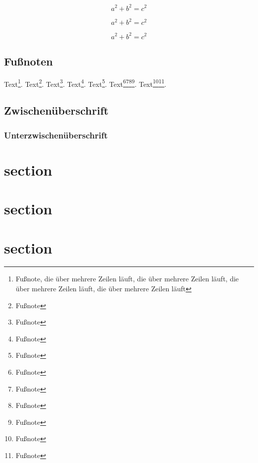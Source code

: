\documentclass[ngerman]{scrartcl}
\begin{document}
	\begin{equation}
		a^2+b^2=c^2
	\end{equation}

	\begin{equation}
		a^2+b^2=c^2
	\end{equation}

	\begin{equation}
		a^2+b^2=c^2
	\end{equation}

	\subsection{Fußnoten}

	Text\footnote{Fußnote, die über mehrere Zeilen läuft, die über mehrere Zeilen läuft, die über mehrere Zeilen läuft, die über mehrere Zeilen läuft}.
	Text\footnote{Fußnote}.
	Text\footnote{Fußnote}.
	Text\footnote{Fußnote}.
	Text\footnote{Fußnote}.
	Text\footnote{Fußnote}\multiplefootnoteseparator\footnote{Fußnote}\footnote{Fußnote}\footnote{Fußnote}.
	Text\footnote{Fußnote}\footnote{Fußnote}.

	\lipsum[1-1]




	\lipsum[1-1]

	\subsection*{Zwischenüberschrift}

	\lipsum[1-1]

	\subsubsection*{Unterzwischenüberschrift}

	\lipsum[1-1]



	\section{section}
	\lipsum[1-5]

	\section{section}
	\lipsum[1-5]

	\section{section}
	\lipsum[1-5]
\end{document}
